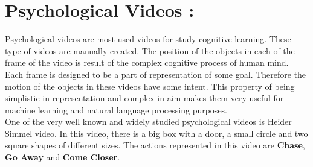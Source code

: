 \def\DevnagVersion{2.15}\documentclass[a4paper, 11pt, notitlepage]{report}
\begin{document}
\section{Psychological Videos :}
\hspace*{10pt} Psychological videos are most used videos for study cognitive learning. These type of videos are manually created. The position of the objects in each of the frame of the video is result of the complex cognitive process of human mind. Each frame is designed to be a part of representation of some goal. Therefore the motion of the objects in these videos have some intent. This property of being simplistic in representation and complex in aim makes them very useful for machine learning and natural language processing purposes.\\
One of the very well known and widely studied psychological videos is Heider Simmel \cite{heider} video. In this video, there is a big box with a door, a small circle and two square shapes of different sizes. The actions represented in this video are {\bf Chase}, {\bf Go Away} and {\bf Come Closer}.
\end{document}
